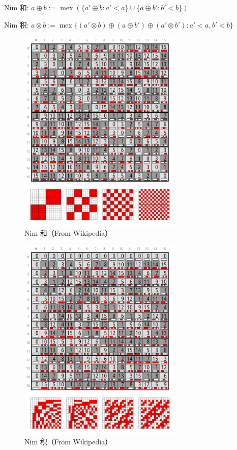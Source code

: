 Nim 和: \(a\oplus b:=\operatorname{mex}\left(\{a'\oplus b:a'<a\}\cup\{a\oplus b':b'<b\}\right)\)

Nim 积: \(a\otimes b:=\operatorname{mex}\{(a'\otimes b)\oplus(a\oplus b')\oplus(a'\otimes b'):a'<a,b'<b\}\)

\begin{figure}[h]
    \label{img:nim-add}
    \includegraphics[width=0.7\textwidth]{img/Nimber-addition.svg}
    \caption{Nim 和（From Wikipedia）}
\end{figure}

\begin{figure}[h]
    \label{img:nim-prod}
    \includegraphics[width=0.7\textwidth]{img/Nimber-multiplication.svg}
    \caption{Nim 积（From Wikipedia）}
\end{figure}

